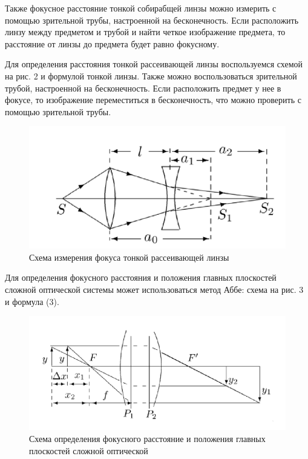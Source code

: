 \documentclass[a4paper,12pt]{article}
\begin{document}
\noindent
Также фокусное расстояние тонкой собирабщей линзы можно измерить с помощью зрительной трубы, настроенной на бесконечность. Если расположить линзу между предметом и трубой и найти четкое изображение предмета, то расстояние от линзы до предмета будет равно фокусному.

\noindent
Для определения расстояния тонкой рассеивающей линзы воспользуемся схемой на рис. 2 и формулой тонкой линзы. Также можно воспользоваться зрительной трубой, настроенной на бесконечность. Если расположить предмет у нее в фокусе, то изображение переместиться в бесконечность, что можно проверить с помощью зрительной трубы.

\begin{figure}[H]
    \centering
    \includegraphics[scale=0.7]{2.png}
    \caption{Схема измерения фокуса тонкой рассеивающей линзы}
\end{figure}

\noindent
Для определения фокусного расстояния и положения главных плоскостей сложной оптической системы может использоваться метод Аббе: схема на рис. 3 и формула (3).

\begin{figure}[H]
    \centering
    \includegraphics[scale=0.7]{3.png}
    \caption{Схема определения фокусного расстояние и положения главных плоскостей сложной оптической}
\end{figure}
\end{document}
